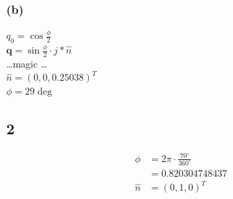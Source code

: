 \documentclass{../Vorlage/mat}
\begin{document}
\subsubsection*{(b)}
$q_0 = \cos{\frac{\phi}{2}}$\\
$\mathbf{q} = \sin{\frac{\phi}{2}}\cdot j * \hat{n}$\\
\ldots magic \ldots\\
$\hat{n} = (0,0,0.25038)^T$\\
$\phi = 29\deg$
\subsection*{2}
\begin{align*}
\phi & = 2 \pi \cdot \frac{70^{\circ}}{360^{\circ}}\\
& = 0.820304748437 \\
\hat{n} & = (0,1,0)^T
\end{align*}
\end{document}

